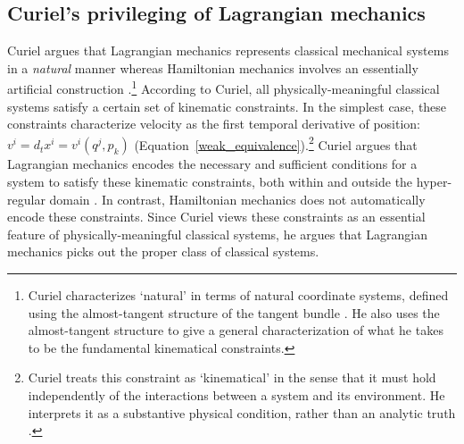 \documentclass[letterpaper]{article}
\begin{document}
\subsection{Curiel's privileging of Lagrangian mechanics}
\label{Curiel}




Curiel argues that Lagrangian mechanics represents classical mechanical systems in a \textit{natural} manner whereas Hamiltonian mechanics involves an essentially artificial construction \parencites*[270]{Curiel}.\footnote{Curiel characterizes `natural' in terms of natural coordinate systems, defined using the almost-tangent structure of the tangent bundle \parencites*[290-291]{Curiel}. He also uses the almost-tangent structure to give a general characterization of what he takes to be the fundamental kinematical constraints.} According to Curiel, all physically-meaningful classical systems satisfy a certain set of kinematic constraints. In the simplest case, these constraints characterize velocity as the first temporal derivative of position: $v^i = d_t x^i = v^i(q^j, p_k)$ (Equation~\ref{weak_equivalence}).\footnote{Curiel treats this constraint as `kinematical' in the sense that it must hold independently of the interactions between a system and its environment. He interprets it as a substantive physical condition, rather than an analytic truth \parencites*[282]{Curiel}.} Curiel argues that Lagrangian mechanics encodes the necessary and sufficient conditions for a system to satisfy these kinematic constraints, both within and outside the hyper-regular domain \parencites*[307--308, 311]{Curiel}. In contrast, Hamiltonian mechanics does not automatically encode these constraints. Since Curiel views these constraints as an essential feature of physically-meaningful classical systems, he argues that Lagrangian mechanics picks out the proper class of classical systems. 
\end{document}
